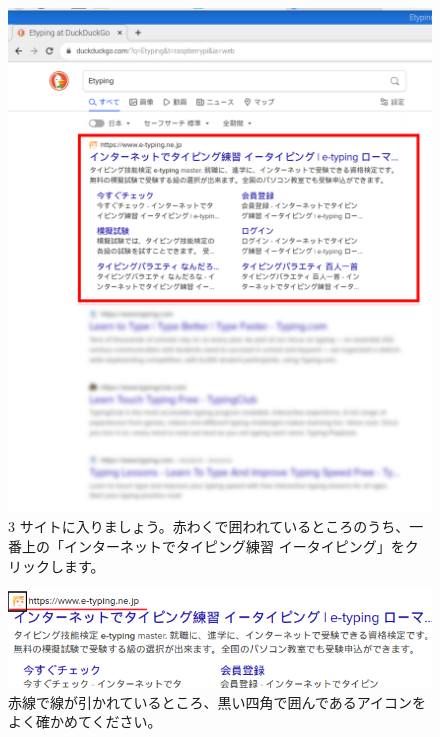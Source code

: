 \begin{figure}[t]
\begin{minipage}{0.45\textwidth}
    \includegraphics[width=\linewidth]{text01-img/textbook-img086.png}
    3 サイトに入りましょう。赤わくで囲われているところのうち、一番上の「インターネットでタイピング練習 イータイピング」をクリックします。
  \end{minipage}
  \begin{minipage}{0.45\textwidth}
    \includegraphics[width=\linewidth]{text01-img/textbook-img085.png}
    赤線で線が引かれているところ、黒い四角で囲んであるアイコンをよく確かめてください。
  \end{minipage}

  \centering

\end{figure}

\clearpage

